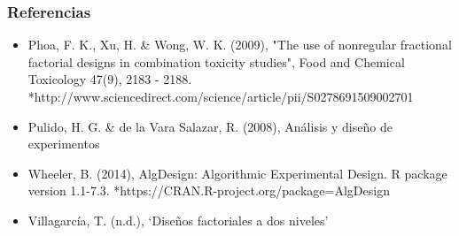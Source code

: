 \documentclass[12pt]{beamer}
\begin{document}
\begin{frame}
\frametitle{Referencias}
\begin{itemize}

\item Phoa, F. K., Xu, H. \& Wong, W. K. (2009), "The use of nonregular fractional factorial designs in combination toxicity studies", Food and Chemical Toxicology 47(9), 2183 - 2188. 
*http://www.sciencedirect.com/science/article/pii/S0278691509002701

\item Pulido, H. G. \& de la Vara Salazar, R. (2008), Análisis y diseño de experimentos


\item Wheeler, B. (2014), AlgDesign: Algorithmic Experimental Design. R package version 1.1-7.3. *https://CRAN.R-project.org/package=AlgDesign



\item Villagarcía, T. (n.d.), `Diseños factoriales a dos niveles'
\end{itemize}
\end{frame}
\end{document}
